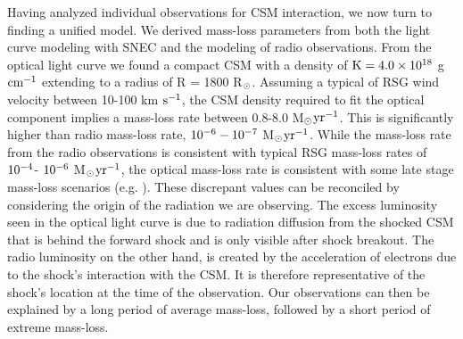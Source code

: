 \documentclass[a4paper,fleqn,usenatbib]{mnras}
\newcommand{\msunperiod}{M$\rm{_{\odot}}$}
\newcommand{\rsun}{R$\rm{_{\odot}}$}
\begin{document}
Having analyzed individual observations for CSM interaction, we now turn to finding a unified model.
We derived mass-loss parameters from both the light curve modeling with SNEC and the modeling of radio observations.
From the optical light curve we found a compact CSM with a density of $\rm{K = 4.0\times10^{18}}$ g $\rm{cm^{-1}}$ extending to a radius of R = 1800 \rsun. 
Assuming a typical of RSG wind velocity between 10-100 km $\rm{s^{-1}}$, the CSM density required to fit the optical component implies a mass-loss rate between 0.8-8.0 \msunperiod $\rm{yr^{-1}}$.
This is significantly higher than radio mass-loss rate, $\rm{10^{-6}-10^{-7}}$ \msunperiod $\rm{yr^{-1}}$.
While the mass-loss rate from the radio observations is consistent with typical RSG mass-loss rates of $\rm{10^{-4} }$- $\rm{10^{-6}}$ \msunperiod $\rm{yr^{-1}}$, the optical mass-loss rate is consistent with some late stage mass-loss scenarios (e.g. \citealt{2001chugai,2012quatert,2014shiode,2017fuller, 2017yaron}).
These discrepant values can be reconciled by considering the origin of the radiation we are observing.
The excess luminosity seen in the optical light curve is due to radiation diffusion from the shocked CSM that is behind the forward shock and is only visible after shock breakout.
The radio luminosity on the other hand, is created by the acceleration of electrons due to the shock's interaction with the CSM.
It is therefore representative of the shock's location at the time of the observation.
Our observations can then be explained by a long period of average mass-loss, followed by a short period of extreme mass-loss.
\end{document}
